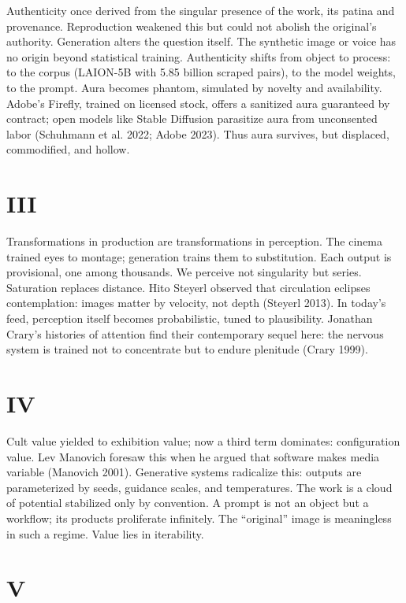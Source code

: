 \documentclass[12pt]{article}
\begin{document}
Authenticity once derived from the singular presence of the work, its patina and provenance. Reproduction weakened this but could not abolish the original’s authority. Generation alters the question itself. The synthetic image or voice has no origin beyond statistical training. Authenticity shifts from object to process: to the corpus (LAION-5B with 5.85 billion scraped pairs), to the model weights, to the prompt. Aura becomes phantom, simulated by novelty and availability. Adobe’s Firefly, trained on licensed stock, offers a sanitized aura guaranteed by contract; open models like Stable Diffusion parasitize aura from unconsented labor (Schuhmann et al. 2022; Adobe 2023). Thus aura survives, but displaced, commodified, and hollow.

\section*{III}

Transformations in production are transformations in perception. The cinema trained eyes to montage; generation trains them to substitution. Each output is provisional, one among thousands. We perceive not singularity but series. Saturation replaces distance. Hito Steyerl observed that circulation eclipses contemplation: images matter by velocity, not depth (Steyerl 2013). In today’s feed, perception itself becomes probabilistic, tuned to plausibility. Jonathan Crary’s histories of attention find their contemporary sequel here: the nervous system is trained not to concentrate but to endure plenitude (Crary 1999).

\section*{IV}

Cult value yielded to exhibition value; now a third term dominates: configuration value. Lev Manovich foresaw this when he argued that software makes media variable (Manovich 2001). Generative systems radicalize this: outputs are parameterized by seeds, guidance scales, and temperatures. The work is a cloud of potential stabilized only by convention. A prompt is not an object but a workflow; its products proliferate infinitely. The “original” image is meaningless in such a regime. Value lies in iterability.

\section*{V}
\end{document}
